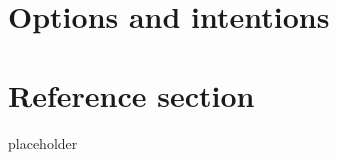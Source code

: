 \documentclass{article}
\begin{document}
\section{Options and intentions}


\pagebreak

\section*{Reference section} \label{sec:reference}
\begin{description}
	\item[placeholder] \hfill \\
\end{description}
\end{document}
